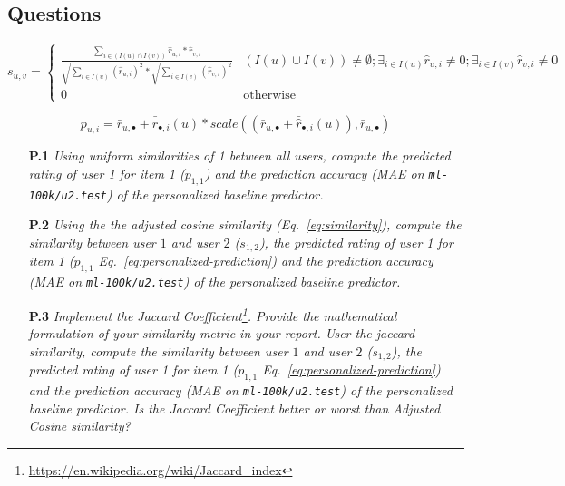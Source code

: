 \documentclass{article}
\begin{document}
\subsection{Questions}
\label{section:q1}

\begin{equation}
    \label{eq:similarity}
    s_{u,v} = \begin{cases}
                   \frac{\sum_{i \in (I(u) \cap I(v))} \hat r_{u,i} * \hat r_{v,i}}
                         { \sqrt{\sum_{i \in I(u)} {(\hat r_{u,i})}^{2}} * \sqrt{\sum_{i \in I(v)} {(\hat r_{v,i})}^{2}}} &
                                    (I(u) \cup I(v)) \neq \emptyset;
                                \exists_{i \in I(u)} \hat r_{u,i} \neq 0; 
                                 \exists_{i \in I(v)} \hat r_{v,i} \neq 0 \\
                         0 & \text{otherwise}
                    \end{cases}
\end{equation}


\begin{equation}
    \label{eq:personalized-prediction}
    p_{u,i} = \bar r_{u,\bullet} + \bar{\hat r}_{\bullet,i}(u) * scale( (\bar r_{u,\bullet} + \bar{\hat r}_{\bullet,i}(u)), \bar r_{u,\bullet})
\end{equation}

  
\begin{itemize}
    \item [\textbf{P.1}] \textit{Using uniform similarities of 1 between all users, compute the predicted rating of user 1 for item 1 ($p_{1,1}$) and the prediction accuracy (MAE on \texttt{ml-100k/u2.test}) of the personalized baseline predictor.} 
    
    \item [\textbf{P.2}] \textit{Using the the adjusted cosine similarity (Eq.~\ref{eq:similarity}), compute the similarity between user $1$ and user $2$ ($s_{1,2}$), the predicted rating of user 1 for item 1 ($p_{1,1}$ Eq.~\ref{eq:personalized-prediction}) and the prediction accuracy (MAE on \texttt{ml-100k/u2.test}) of the personalized baseline predictor.} 
    
        \item [\textbf{P.3}] \textit{Implement the Jaccard Coefficient\footnote{\url{https://en.wikipedia.org/wiki/Jaccard_index}}. Provide the mathematical formulation of your similarity metric in your report. User the jaccard similarity, compute the similarity between user $1$ and user $2$ ($s_{1,2}$), the predicted rating of user 1 for item 1 ($p_{1,1}$ Eq.~\ref{eq:personalized-prediction}) and the prediction accuracy (MAE on \texttt{ml-100k/u2.test}) of the personalized baseline predictor. Is the Jaccard Coefficient better or worst than Adjusted Cosine similarity?}
\end{itemize}
\end{document}
